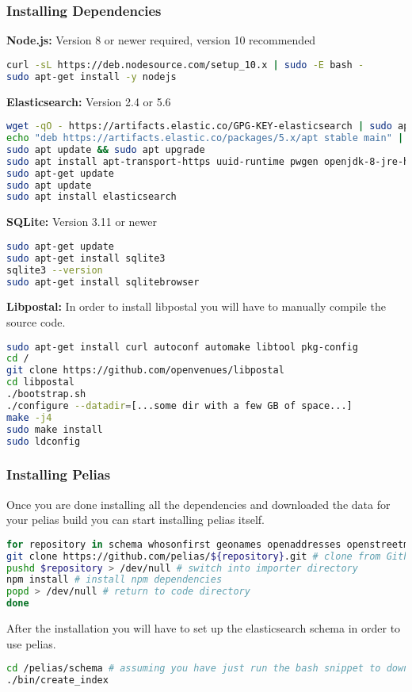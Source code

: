 \subsubsection{Installing Dependencies}
\textbf{Node.js:} Version 8 or newer required, version 10 recommended

\begin{lstlisting}[language=bash,breaklines=true]
curl -sL https://deb.nodesource.com/setup_10.x | sudo -E bash -
sudo apt-get install -y nodejs
\end{lstlisting}

\textbf{Elasticsearch:} Version 2.4 or 5.6

\begin{lstlisting}[language=bash,breaklines=true]
wget -qO - https://artifacts.elastic.co/GPG-KEY-elasticsearch | sudo apt-key add -
echo "deb https://artifacts.elastic.co/packages/5.x/apt stable main" | sudo tee -a /etc/apt/sources.list.d/elastic-5.x.list
sudo apt update && sudo apt upgrade
sudo apt install apt-transport-https uuid-runtime pwgen openjdk-8-jre-headless
sudo apt-get update
sudo apt update
sudo apt install elasticsearch
\end{lstlisting}

\textbf{SQLite:} Version 3.11 or newer

\begin{lstlisting}[language=bash,breaklines=true]
sudo apt-get update
sudo apt-get install sqlite3
sqlite3 --version
sudo apt-get install sqlitebrowser
\end{lstlisting}

\textbf{Libpostal:}
In order to install libpostal you will have to manually compile the source code.

\begin{lstlisting}[language=bash,breaklines=true]
sudo apt-get install curl autoconf automake libtool pkg-config
cd /
git clone https://github.com/openvenues/libpostal
cd libpostal
./bootstrap.sh
./configure --datadir=[...some dir with a few GB of space...]
make -j4
sudo make install
sudo ldconfig
\end{lstlisting}

\subsubsection{Installing Pelias}
Once you are done installing all the dependencies and downloaded the data for your pelias build you can start installing pelias itself.

\begin{lstlisting}[language=bash,breaklines=true]
for repository in schema whosonfirst geonames openaddresses openstreetmap polylines api placeholder interpolation pip-service; do
git clone https://github.com/pelias/${repository}.git # clone from Github
pushd $repository > /dev/null # switch into importer directory
npm install # install npm dependencies
popd > /dev/null # return to code directory
done
\end{lstlisting}

After the installation you will have to set up the elasticsearch schema in order to use pelias.

\begin{lstlisting}[language=bash,breaklines=true]
cd /pelias/schema # assuming you have just run the bash snippet to download the repos from earlier
./bin/create_index
\end{lstlisting}